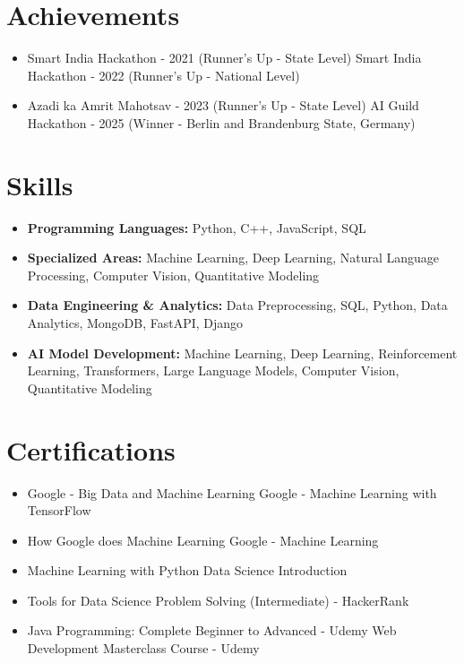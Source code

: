 \documentclass[a4paper,10pt]{article}
\begin{document}
\section*{Achievements}
\begin{itemize}
\item Smart India Hackathon - 2021 (Runner's Up - State Level) \hfill Smart India Hackathon - 2022 (Runner's Up - National Level)
\item Azadi ka Amrit Mahotsav - 2023 (Runner's Up - State Level) \hfill AI Guild Hackathon - 2025 (Winner - Berlin and Brandenburg State, Germany)
\end{itemize}

\section*{Skills}
\begin{itemize}
  \item \textbf{Programming Languages:} Python, C++, JavaScript, SQL
  \item \textbf{Specialized Areas:} Machine Learning, Deep Learning, Natural Language Processing, Computer Vision, Quantitative Modeling
  \item \textbf{Data Engineering \& Analytics:} Data Preprocessing, SQL, Python, Data Analytics, MongoDB, FastAPI, Django
  \item \textbf{AI Model Development:} Machine Learning, Deep Learning, Reinforcement Learning, Transformers, Large Language Models, Computer Vision, Quantitative Modeling
\end{itemize}

\section*{Certifications}
\begin{itemize}
\item Google - Big Data and Machine Learning \hfill Google - Machine Learning with TensorFlow
\item How Google does Machine Learning \hfill Google - Machine Learning
\item Machine Learning with Python \hfill Data Science Introduction
\item Tools for Data Science \hfill Problem Solving (Intermediate) - HackerRank
\item Java Programming: Complete Beginner to Advanced - Udemy \hfill Web Development Masterclass Course - Udemy
\end{itemize}
\end{document}
